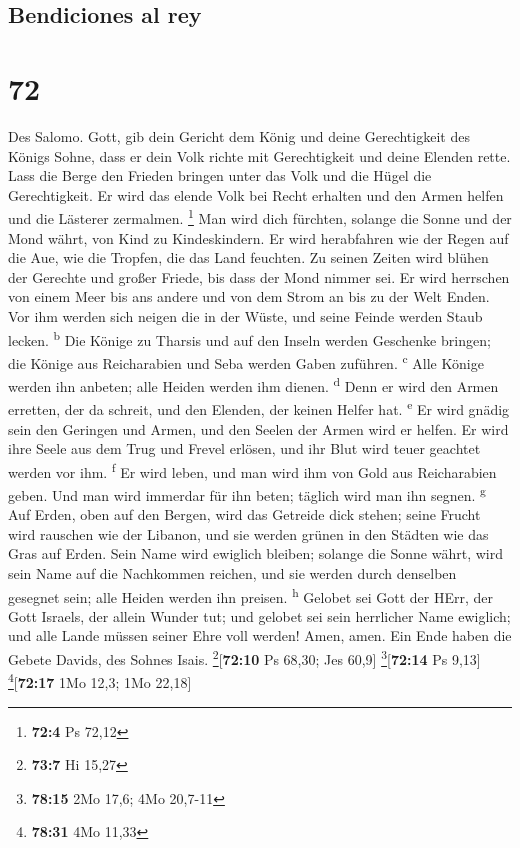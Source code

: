 \hypertarget{bendiciones-al-rey}{%
\subsection{Bendiciones al rey}\label{bendiciones-al-rey}}

\hypertarget{section-71}{%
\section{72}\label{section-71}}

 Des Salomo. Gott, gib dein Gericht dem König und deine
Gerechtigkeit des Königs Sohne,  dass er dein Volk richte
mit Gerechtigkeit und deine Elenden rette.  Lass die Berge
den Frieden bringen unter das Volk und die Hügel die Gerechtigkeit.
 Er wird das elende Volk bei Recht erhalten und den Armen
helfen und die Lästerer zermalmen. \footnote{\textbf{72:4} Ps 72,12}
 Man wird dich fürchten, solange die Sonne und der Mond
währt, von Kind zu Kindeskindern.  Er wird herabfahren wie
der Regen auf die Aue, wie die Tropfen, die das Land feuchten.
 Zu seinen Zeiten wird blühen der Gerechte und großer
Friede, bis dass der Mond nimmer sei.  Er wird herrschen
von einem Meer bis ans andere und von dem Strom an bis zu der Welt
Enden.  Vor ihm werden sich neigen die in der Wüste, und
seine Feinde werden Staub lecken. \textsuperscript{b} 
Die Könige zu Tharsis und auf den Inseln werden Geschenke bringen; die
Könige aus Reicharabien und Seba werden Gaben zuführen.
\textsuperscript{c}  Alle Könige werden ihn anbeten; alle
Heiden werden ihm dienen. \textsuperscript{d}  Denn er
wird den Armen erretten, der da schreit, und den Elenden, der keinen
Helfer hat. \textsuperscript{e}  Er wird gnädig sein den
Geringen und Armen, und den Seelen der Armen wird er helfen.
 Er wird ihre Seele aus dem Trug und Frevel erlösen, und
ihr Blut wird teuer geachtet werden vor ihm. \textsuperscript{f}
 Er wird leben, und man wird ihm von Gold aus
Reicharabien geben. Und man wird immerdar für ihn beten; täglich wird
man ihn segnen. \textsuperscript{g}  Auf Erden, oben auf
den Bergen, wird das Getreide dick stehen; seine Frucht wird rauschen
wie der Libanon, und sie werden grünen in den Städten wie das Gras auf
Erden.  Sein Name wird ewiglich bleiben; solange die
Sonne währt, wird sein Name auf die Nachkommen reichen, und sie werden
durch denselben gesegnet sein; alle Heiden werden ihn preisen.
\textsuperscript{h}  Gelobet sei Gott der HErr, der Gott
Israels, der allein Wunder tut;  und gelobet sei sein
herrlicher Name ewiglich; und alle Lande müssen seiner Ehre voll werden!
Amen, amen.  Ein Ende haben die Gebete Davids, des Sohnes
Isais. \footnote{\textbf{73:7} Hi 15,27}{[}\textbf{72:10} Ps 68,30; Jes
60,9{]} \footnote{\textbf{78:15} 2Mo 17,6; 4Mo 20,7-11}{[}\textbf{72:14}
Ps 9,13{]} \footnote{\textbf{78:31} 4Mo 11,33}{[}\textbf{72:17} 1Mo
12,3; 1Mo 22,18{]}

